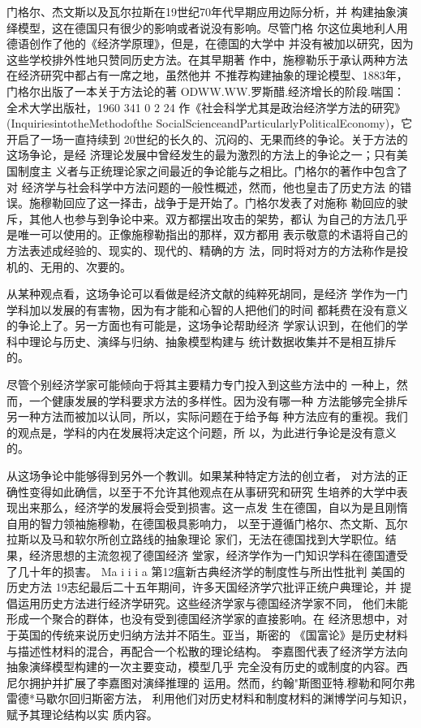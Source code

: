 门格尔、杰文斯以及瓦尔拉斯在19世纪70年代早期应用边际分析，并
构建抽象演绎模型，这在德国只有很少的影响或者说没有影响。尽管门格
尔这位奥地利人用德语创作了他的《经济学原理》，但是，在德国的大学中
并没有被加以研究，因为这些学校排外性地只赞同历史方法。在其早期著
作中，施穆勒乐于承认两种方法在经济研究中都占有一席之地，虽然他并
不推荐构建抽象的理论模型、1883年，门格尔出版了一本关于方法论的著
ODWW.WW.罗斯醋.经济增长的阶段.喘国：全术大学出版社，1960
341
0
2
24
作《社会科学尤其是政治经济学方法的研究》(InquiriesintotheMethodofthe
SocialScienceandParticularlyPoliticalEconomy)，它开启了一场一直持续到
20世纪的长久的、沉闷的、无果而终的争论。关于方法的这场争论，是经
济理论发展中曾经发生的最为激烈的方法上的争论之一；只有美国制度主
义者与正统理论家之间最近的争论能与之相比。门格尔的著作中包含了对
经济学与社会科学中方法问题的一般性概述，然而，他也皇击了历史方法
的错误。施穆勒回应了这一择击，战争于是开始了。门格尔发表了对施称
勒回应的驶斥，其他人也参与到争论中来。双方都摆出攻击的架势，都认
为自己的方法几乎是唯一可以使用的。正像施穆勒指出的那样，双方都用
表示敬意的术语将自己的方法表述成经验的、现实的、现代的、精确的方
法，同时将对方的方法称作是投机的、无用的、次要的。

从某种观点看，这场争论可以看做是经济文献的纯粹死胡同，是经济
学作为一门学科加以发展的有害物，因为有才能和心智的人把他们的时间
都耗费在没有意义的争论上了。另一方面也有可能是，这场争论帮助经济
学家认识到，在他们的学科中理论与历史、演绎与归纳、抽象模型构建与
统计数据收集并不是相互排斥的。

尽管个别经济学家可能倾向于将其主要精力专门投入到这些方法中的
一种上，然而，一个健康发展的学科要求方法的多样性。因为没有哪一种
方法能够完全排斥另一种方法而被加以认同，所以，实际问题在于给予每
种方法应有的重视。我们的观点是，学科的内在发展将决定这个问题，所
以，为此进行争论是没有意义的。

从这场争论中能够得到另外一个教训。如果某种特定方法的创立者，
对方法的正确性变得如此确信，以至于不允许其他观点在从事研究和研究
生培养的大学中表现出来那么，经济学的发展将会受到损害。这一点发
生在德国，自以为是且刚惰自用的智力领袖施穆勒，在德国极具影响力，
以至于遵循门格尔、杰文斯、瓦尔拉斯以及马和软尔所创立路线的抽象理论
家们，无法在德国找到大学职位。结果，经济思想的主流忽视了德国经济
堂家，经济学作为一门知识学科在德国遭受了几十年的损害。
Ma
i
i
i
a
第12瘟新古典经济学的制度性与所出性批判
美国的历史方法
19志纪最后二十五年期间，许多天国经济学穴批评正统户典理论，并
提倡运用历史方法进行经济学研究。这些经济学家与德国经济学家不同，
他们未能形成一个聚合的群体，也没有受到德国经济学家的直接影响。在
经济思想中，对于英国的传统来说历史归纳方法并不陌生。亚当，斯密的
《国富论》是历史材料与描述性材料的混合，再配合一个松散的理论结构。
李嘉图代表了经济学方法向抽象演绎模型构建的一次主要变动，模型几乎
完全没有历史的或制度的内容。西尼尔拥护并扩展了李嘉图对演绎推理的
运用。然而，约翰"斯图亚特.穆勒和阿尔弗雷德*马歇尔回归斯密方法，
利用他们对历史材料和制度材料的渊博学问与知识，赋予其理论结构以实
质内容。

